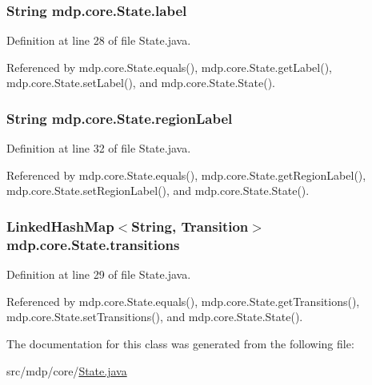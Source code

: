 \subsubsection[{label}]{\setlength{\rightskip}{0pt plus 5cm}String mdp.\+core.\+State.\+label\hspace{0.3cm}{\ttfamily [private]}}\label{classmdp_1_1core_1_1_state_a40b54cc46e175c748d5ce129aba70633}


Definition at line 28 of file State.\+java.



Referenced by mdp.\+core.\+State.\+equals(), mdp.\+core.\+State.\+get\+Label(), mdp.\+core.\+State.\+set\+Label(), and mdp.\+core.\+State.\+State().

\hypertarget{classmdp_1_1core_1_1_state_aa6f24dca5cb78d028e99f69b9e6ccb2c}{}
\subsubsection[{region\+Label}]{\setlength{\rightskip}{0pt plus 5cm}String mdp.\+core.\+State.\+region\+Label\hspace{0.3cm}{\ttfamily [private]}}\label{classmdp_1_1core_1_1_state_aa6f24dca5cb78d028e99f69b9e6ccb2c}


Definition at line 32 of file State.\+java.



Referenced by mdp.\+core.\+State.\+equals(), mdp.\+core.\+State.\+get\+Region\+Label(), mdp.\+core.\+State.\+set\+Region\+Label(), and mdp.\+core.\+State.\+State().

\hypertarget{classmdp_1_1core_1_1_state_a3c9b563199f7e235fe083b0d16da8cf3}{}
\subsubsection[{transitions}]{\setlength{\rightskip}{0pt plus 5cm}Linked\+Hash\+Map$<$String, {\bf Transition}$>$ mdp.\+core.\+State.\+transitions\hspace{0.3cm}{\ttfamily [private]}}\label{classmdp_1_1core_1_1_state_a3c9b563199f7e235fe083b0d16da8cf3}


Definition at line 29 of file State.\+java.



Referenced by mdp.\+core.\+State.\+equals(), mdp.\+core.\+State.\+get\+Transitions(), mdp.\+core.\+State.\+set\+Transitions(), and mdp.\+core.\+State.\+State().



The documentation for this class was generated from the following file\+:\begin{DoxyCompactItemize}
\item 
src/mdp/core/\hyperlink{_state_8java}{State.\+java}\end{DoxyCompactItemize}
